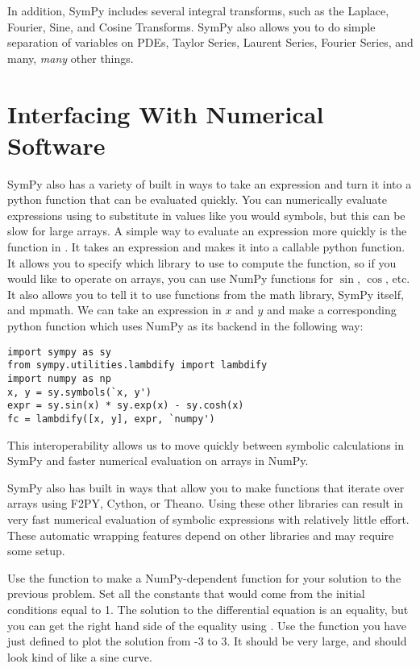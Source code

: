In addition, SymPy includes several integral transforms, such as the Laplace, Fourier, Sine, and Cosine Transforms.
SymPy also allows you to do simple separation of variables on PDEs, Taylor Series, Laurent Series, Fourier Series, and many, \textit{many} other things.

\section*{Interfacing With Numerical Software}
SymPy also has a variety of built in ways to take an expression and turn it into a python function that can be evaluated quickly.
You can numerically evaluate expressions using  to substitute in values like you would symbols, but this can be slow for large arrays.
A simple way to evaluate an expression more quickly is the  function in .
It takes an expression and makes it into a callable python function. 
It allows you to specify which library to use to compute the function, so if you would like to operate on arrays, you can use NumPy functions for $\sin$, $\cos$, etc.
It also allows you to tell it to use functions from the math library, SymPy itself, and mpmath.
We can take an expression in $x$ and $y$ and make a corresponding python function  which uses NumPy as its backend in the following way:
\begin{lstlisting}
import sympy as sy
from sympy.utilities.lambdify import lambdify
import numpy as np
x, y = sy.symbols(`x, y')
expr = sy.sin(x) * sy.exp(x) - sy.cosh(x)
fc = lambdify([x, y], expr, `numpy')
\end{lstlisting}
This interoperability allows us to move quickly between symbolic calculations in SymPy and faster numerical evaluation on arrays in NumPy.

SymPy also has built in ways that allow you to make functions that iterate over arrays using F2PY, Cython, or Theano.
Using these other libraries can result in very fast numerical evaluation of symbolic expressions with relatively little effort.
These automatic wrapping features depend on other libraries and may require some setup.

\begin{problem}
Use the  function to make a NumPy-dependent function for your solution to the previous problem. Set all the constants that would come from the initial conditions equal to 1.
The solution to the differential equation is an equality, but you can get the right hand side of the equality using .
Use the function you have just defined to plot the solution from -3 to 3. 
It should be very large, and should look kind of like a sine curve.
\end{problem}

